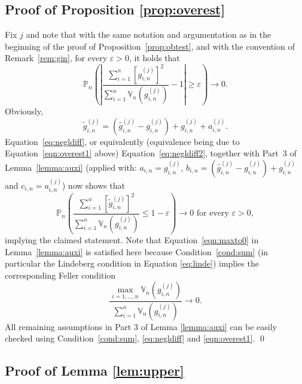 \documentclass[preprint]{imsart}
\newcommand{\eps}{\varepsilon}
\numberwithin{equation}{section}
\begin{document}
\subsection{Proof of Proposition \ref{prop:overest}}

Fix $j$ and note that with the same notation and argumentation as in the beginning of the proof of Proposition~\ref{prop:obtest}, and with the convention of Remark~\ref{rem:gin}, for every $\eps > 0$, it holds that
%
\begin{equation}\label{eqn:overest1}
\mathbb{P}_n \left(\left|\frac{\sum_{i = 1}^n [g_{i,n}^{(j)}]^2}{\sum_{i = 1}^n \mathbb{V}_n(g_{i,n}^{(j)})} - 1 \right| \geq \eps \right) \to 0.
\end{equation}
% 
Obviously, 
%
\begin{equation}
\tilde{g}_{i,n}^{(j)} = \left( \hat{g}_{i,n}^{(j)} - g_{i,n}^{(j)}\right) + g_{i,n}^{(j)} + a_{i,n}^{(j)}. 
\end{equation}
%
Equation~\eqref{eq:negldiff}, or equivalently (equivalence being due to  Equation~\eqref{eqn:overest1} above) Equation~\eqref{eq:negldiff2}, together with Part~3 of Lemma~\ref{lemma:auxi} (applied with: $a_{i,n} = g_{i,n}^{(j)}$, $b_{i,n} = \left( \hat{g}_{i,n}^{(j)} - g_{i,n}^{(j)}\right) + g_{i,n}^{(j)}$ and $c_{i,n} = a_{i,n}^{(j)}$) now shows that
%
\begin{equation}
\mathbb{P}_n \left( \frac{\sum_{i = 1}^n [\tilde{g}_{i,n}^{(j)}]^2 }{\sum_{i = 1}^n \mathbb{V}_n(g_{i,n}^{(j)})} \leq 1-\eps \right) \to 0 \text{ for every } \eps > 0,
\end{equation}
%
implying the claimed statement. Note that Equation~\eqref{eqn:maxto0} in Lemma~\ref{lemma:auxi} is satisfied here because Condition~\ref{cond:sum} (in particular the Lindeberg condition in Equation \eqref{eq:linde}) implies the corresponding Feller condition
%
\begin{equation}\label{eqn:feller}
\frac{\max_{i = 1, \hdots, {n}} \mathbb{V}_{n}(g_{i,{n}}^{(j)})}{\sum_{i = 1}^{n} \mathbb{V}_{n}(g_{i,{n}}^{(j)})} \to 0.
\end{equation}
%
All remaining assumptions in Part 3 of Lemma \ref{lemma:auxi} can be easily checked using Condition~\ref{cond:sum}, \eqref{eq:negldiff} and \eqref{eqn:overest1}. \hfill\qed

\subsection{Proof of Lemma \ref{lem:upper}} 
\end{document}
